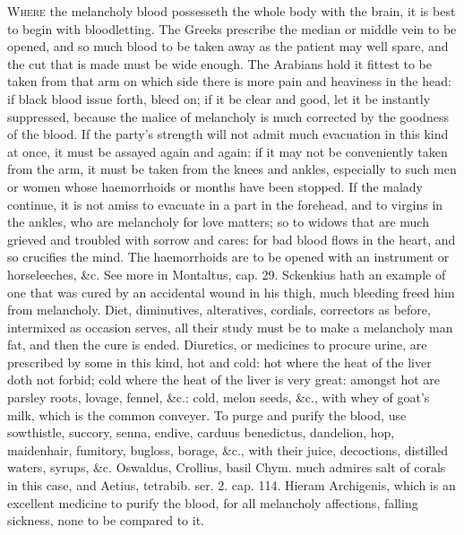 \lettrine{W}{here} the melancholy blood possesseth the whole body with the brain,
 it is best to begin with bloodletting. The Greeks prescribe the
 median or middle vein to be opened, and so much blood to be
taken away as the patient may well spare, and the cut that is made must
be wide enough. The Arabians hold it fittest to be taken from that arm
on which side there is more pain and heaviness in the head: if black
blood issue forth, bleed on; if it be clear and good, let it be
instantly suppressed,  because the malice of melancholy is much
corrected by the goodness of the blood. If the party's strength will
not admit much evacuation in this kind at once, it must be assayed
again and again: if it may not be conveniently taken from the arm, it
must be taken from the knees and ankles, especially to such men or
women whose haemorrhoids or months have been stopped.  If the
malady continue, it is not amiss to evacuate in a part in the forehead,
and to virgins in the ankles, who are melancholy for love matters; so
to widows that are much grieved and troubled with sorrow and cares: for
bad blood flows in the heart, and so crucifies the mind. The
haemorrhoids are to be opened with an instrument or horseleeches, \&c.
See more in Montaltus, cap. 29. Sckenkius hath an example of one
that was cured by an accidental wound in his thigh, much bleeding freed
him from melancholy. Diet, diminutives, alteratives, cordials,
correctors as before, intermixed as occasion serves, all their
study must be to make a melancholy man fat, and then the cure is ended.
Diuretics, or medicines to procure urine, are prescribed by some in
this kind, hot and cold: hot where the heat of the liver doth not
forbid; cold where the heat of the liver is very great: amongst
hot are parsley roots, lovage, fennel, \&c.: cold, melon seeds, \&c.,
with whey of goat's milk, which is the common conveyer.
To purge and purify the blood, use sowthistle, succory, senna,
endive, carduus benedictus, dandelion, hop, maidenhair, fumitory,
bugloss, borage, \&c., with their juice, decoctions, distilled waters,
syrups, \&c.
Oswaldus, Crollius, basil Chym. much admires salt of corals in this
case, and Aetius, tetrabib. ser. 2. cap. 114. Hieram Archigenis, which
is an excellent medicine to purify the blood, for all melancholy
affections, falling sickness, none to be compared to it.


